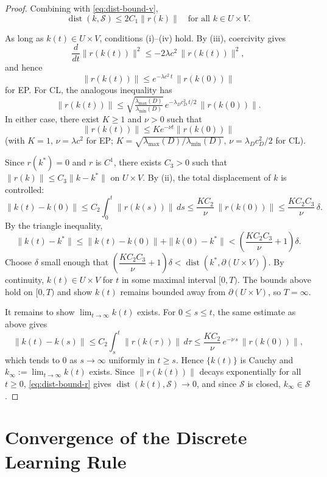 \documentclass{siamart}
\begin{document}
\begin{proof}
Combining with \eqref{eq:dist-bound-v},
\begin{equation}
\operatorname{dist}(k,\mathcal S) \le 2C_1 \|r(k)\|
\quad \text{for all } k \in U \times V.
\label{eq:dist-bound-r}
\end{equation}

As long as $k(t) \in U \times V$, conditions (i)--(iv) hold. By (iii), coercivity gives
\[
\dfrac{d}{dt}\|r(k(t))\|^2 \le -2\lambda c^2\, \|r(k(t))\|^2,
\]
and hence
\[
\|r(k(t))\| \le e^{-\lambda c^2\, t}\, \|r(k(0))\|
\]
for EP. For CL, the analogous inequality has
\[\|r(k(t))\| \le \sqrt{\tfrac{\lambda_{\max}(D)}{\lambda_{\min}(D)}}\,e^{-\lambda_D c_D^2\, t/2}\, \|r(k(0))\|.\]
In either case, there exist $K\ge 1$ and $\nu>0$ such that \[\|r(k(t))\| \le Ke^{-\nu t}\|r(k(0))\|\] (with $K=1,\,\nu=\lambda c^2$ for EP; $K=\sqrt{\lambda_{\max}(D)/\lambda_{\min}(D)},\,\nu = \lambda_D c_D^2/2$ for CL).          

Since $r(k^*) = 0$ and $r$ is $C^1$, there exists $C_3 > 0$ such that $\|r(k)\| \leq C_3\|k - k^*\|$ on $U \times V$. By (ii), the total displacement of $k$ is controlled:
\[
\|k(t) - k(0)\| \le C_2 \int_0^t \|r(k(s))\|\, ds \le \dfrac{KC_2}{\nu}\, \|r(k(0))\| \leq \dfrac{KC_2 C_3}{\nu}\, \delta.
\]
By the triangle inequality,
\[
\|k(t) - k^*\| \leq \|k(t) - k(0)\| + \|k(0) - k^*\| < \left(\dfrac{KC_2 C_3}{\nu}+1\right)\delta.
\]
Choose $\delta$ small enough that $\left(\dfrac{KC_2 C_3}{\nu}+1\right)\delta < \operatorname{dist}(k^*, \partial(U \times V))$. By continuity, $k(t) \in U \times V$ for $t$ in some maximal interval $[0,T)$. The bounds above hold on $[0,T)$ and show $k(t)$ remains bounded away from $\partial(U \times V)$, so $T = \infty$.

It remains to show $\lim_{t \to \infty} k(t)$ exists. For $0 \le s \le t$, the same estimate as above gives
\[
\|k(t) - k(s)\| \le C_2 \int_s^t \|r(k(\tau))\|\, d\tau
\le \dfrac{KC_2}{\nu}\, e^{-\nu\, s}\, \|r(k(0))\|,
\]
which tends to $0$ as $s \to \infty$ uniformly in $t \ge s$. Hence $\{k(t)\}$ is Cauchy and $k_\infty := \lim_{t \to \infty} k(t)$ exists. Since $\|r(k(t))\|$ decays exponentially for all $t \ge 0$, \eqref{eq:dist-bound-r} gives $\operatorname{dist}(k(t),\mathcal S) \to 0$, and since $\mathcal{S}$ is closed, $k_\infty \in \mathcal{S}$.
\end{proof}

\section{Convergence of the Discrete Learning Rule}
\label{sec:discrete}
\end{document}
